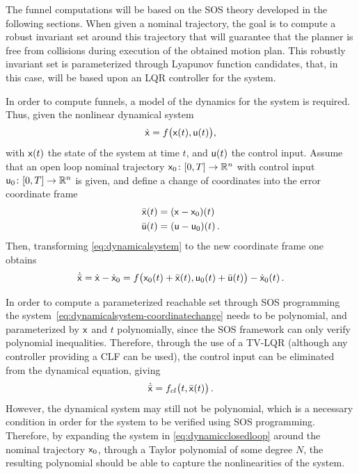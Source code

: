 The funnel computations will be based on the \ac{SOS} theory developed in the
following sections. When given a nominal trajectory, the goal is to compute a
robust invariant set around this trajectory that will guarantee that the planner
is free from collisions during execution of the obtained motion plan. This
robustly invariant set is parameterized through Lyapunov function candidates,
that, in this case, will be based upon an \ac{LQR} controller for the system.

In order to compute funnels, a model of the dynamics for the system is required.
Thus, given the nonlinear dynamical system
\begin{equation}
  \label{eq:dynamicalsystem}
  \dot{{\mathbf{\mathsf{x}}}} = f\big({\mathbf{\mathsf{x}}}(t), {\mathbf{\mathsf{u}}}(t) \big),
\end{equation}
with \({\mathbf{\mathsf{x}}}(t)\) the state of the system at time \(t\), and \({\mathbf{\mathsf{u}}}(t)\)
the control input. Assume that an open loop nominal trajectory \({\mathbf{\mathsf{x}}}_0
\colon [0,T] \rightarrow \mathbb{R}^n\) with control input \({\mathbf{\mathsf{u}}}_0 \colon [0,T]
\rightarrow \mathbb{R}^n\) is given, and define a change of coordinates into the error
coordinate frame
\begin{align}
  \label{eq:system-error-dynamics}
  \bar{{\mathbf{\mathsf{x}}}}(t) &= ( {\mathbf{\mathsf{x}}} - {\mathbf{\mathsf{x}}}_0 )(t) \\
  \bar{{\mathbf{\mathsf{u}}}}(t) &= ({\mathbf{\mathsf{u}}} - {\mathbf{\mathsf{u}}}_0 )(t) \, .
\end{align}
Then, transforming \cref{eq:dynamicalsystem} to the new coordinate frame one
obtains
\begin{equation}
  \label{eq:dynamicalsystem-coordinatechange}
  \dot{\bar{{\mathbf{\mathsf{x}}}}} = \dot{{\mathbf{\mathsf{x}}}} - \dot{{\mathbf{\mathsf{x}}}}_0 = f\big( {\mathbf{\mathsf{x}}}_0(t) + \bar{{\mathbf{\mathsf{x}}}}(t), {\mathbf{\mathsf{u}}}_0(t) + \bar{{\mathbf{\mathsf{u}}}}(t) \big) - \dot{{\mathbf{\mathsf{x}}}}_0(t) \, .
\end{equation}

In order to compute a parameterized reachable set through \ac{SOS} programming
the system~\cref{eq:dynamicalsystem-coordinatechange} needs to be polynomial,
and parameterized by \({\mathbf{\mathsf{x}}}\) and \(t\) polynomially, since the \ac{SOS}
framework can only verify polynomial inequalities. Therefore, through the use of
a \ac{TV-LQR} (although any controller providing a \ac{CLF} can be used), the
control input can be eliminated from the dynamical equation, giving
\begin{equation}
  \label{eq:dynamicclosedloop}
  \dot{\bar{{\mathbf{\mathsf{x}}}}} = f_{cl}\big( t,\bar{{\mathbf{\mathsf{x}}}}(t) \big) \, .
\end{equation}
However, the dynamical system may still not be polynomial, which is a necessary
condition in order for the system to be verified using \ac{SOS} programming.
Therefore, by expanding the system in \cref{eq:dynamicclosedloop} around the
nominal trajectory \({\mathbf{\mathsf{x}}}_0\), through a Taylor polynomial of some degree
\(N\), the resulting polynomial should be able to capture the nonlinearities of
the system.

